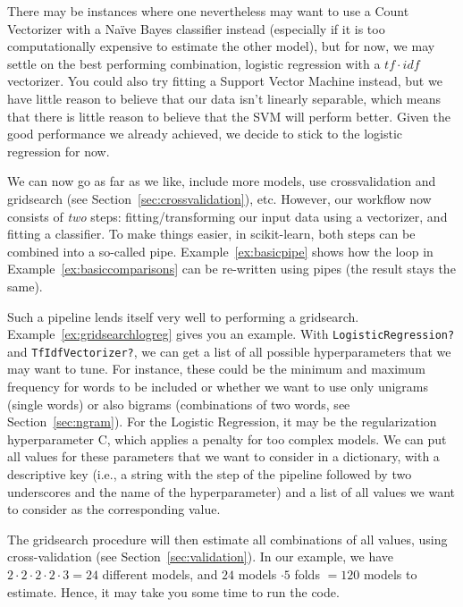There may be instances where one nevertheless may want to use a Count
Vectorizer with a Na\"ive Bayes classifier instead (especially if it
is too computationally expensive to estimate the other model), but for
now, we may settle on the best performing combination, logistic
regression with a $tf\cdot idf$ vectorizer. You could also try fitting
a Support Vector Machine instead, but we have little reason to believe
that our data isn't linearly separable, which means that there is
little reason to believe that the SVM will perform better. Given the
good performance we already achieved, we decide to stick to the
logistic regression for now.


We can now go as far as we like, include more models, use
crossvalidation and gridsearch (see
Section~\ref{sec:crossvalidation}), etc. However, our workflow now
consists of \emph{two} steps: fitting/transforming our input data
using a vectorizer, and fitting a classifier. To make things easier,
in scikit-learn, both steps can be combined into a so-called
pipe. Example~\ref{ex:basicpipe} shows how the loop in
Example~\ref{ex:basiccomparisons} can be re-written using pipes (the
result stays the same).


Such a pipeline lends itself very well to performing a
gridsearch. Example~\ref{ex:gridsearchlogreg} gives you an example.  With
\verb|LogisticRegression?| and \verb|TfIdfVectorizer?|, we can get a list of all
possible hyperparameters that we may want to tune. For instance, these
could be the minimum and maximum frequency for words to be included or
whether we want to use only unigrams (single words) or also bigrams
(combinations of two words, see Section~\ref{sec:ngram}).
For the Logistic Regression, it may be the
regularization hyperparameter C, which applies a penalty for too
complex models.  We can  put all values for these parameters
that we want to consider in a dictionary, with a descriptive key (i.e., a string with the step of the pipeline followed by two underscores and the name of the hyperparameter) and a list of all values we want to consider as the corresponding value.

The gridsearch procedure will then estimate all combinations of all
values, using cross-validation (see Section~\ref{sec:validation}). In
our example, we have $2 \cdot 2 \cdot 2 \cdot 2 \cdot 3 = 24$
different models, and $24$ models $\cdot 5$ folds $= 120$ models to
estimate. Hence, it may take you some time to run the code.


